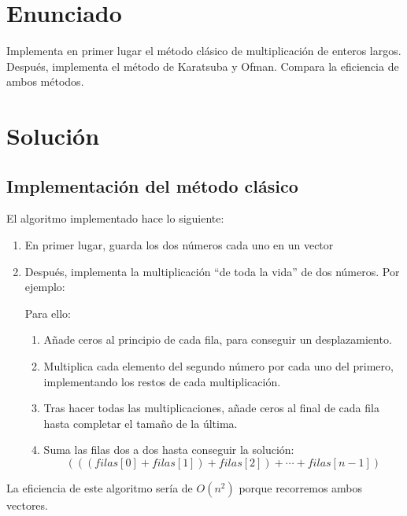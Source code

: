 \documentclass[10pt,a4paper,spanish]{report}
\begin{document}
\section{\textcolor[rgb]{0,0.2,1}Enunciado}
{\Large Implementa en primer lugar el método clásico de multiplicación de enteros largos. Después, implementa el método de Karatsuba y Ofman. Compara la eficiencia de ambos métodos.}

\section{\textcolor[rgb]{1,0.6,0}Solución}
\subsection{\textcolor[rgb]{1,0,0.6}Implementación del método clásico}
El algoritmo implementado hace lo siguiente:
\begin{enumerate}
  \item En primer lugar, guarda los dos números cada uno en un vector
  \item Después, implementa la multiplicación ``de toda la vida'' de dos números. Por ejemplo:

  \begin{center}
  
  \end{center}

  Para ello:
  \begin{enumerate}
    \item Añade ceros al principio de cada fila, para conseguir un desplazamiento.
    \item Multiplica cada elemento del segundo número por cada uno del primero, implementando los restos de cada multiplicación.
    \item Tras hacer todas las multiplicaciones, añade ceros al final de cada fila hasta completar el tamaño de la última.
    \item Suma las filas dos a dos hasta conseguir la solución:
    \begin{displaymath}
    (((filas[0]+filas[1])+filas[2])+\cdots+filas[n-1])
    \end{displaymath}
  \end{enumerate}
\end{enumerate}

La eficiencia de este algoritmo sería de $O(n^2)$ porque recorremos ambos vectores.

\end{document}
